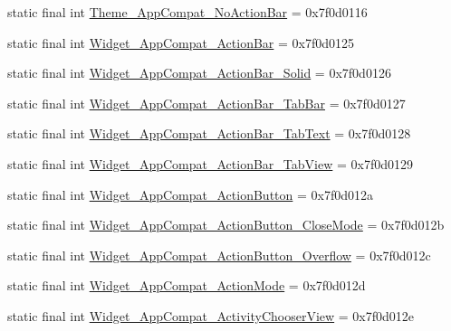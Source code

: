 \begin{DoxyCompactItemize}
\item 
static final int \mbox{\hyperlink{classcom_1_1synnapps_1_1carouselview_1_1_r_1_1style_a14a61ee7904eff959b046b3f48b99ffd}{Theme\+\_\+\+App\+Compat\+\_\+\+No\+Action\+Bar}} = 0x7f0d0116
\item 
static final int \mbox{\hyperlink{classcom_1_1synnapps_1_1carouselview_1_1_r_1_1style_a4849cac4a08a3f020c38133f14896450}{Widget\+\_\+\+App\+Compat\+\_\+\+Action\+Bar}} = 0x7f0d0125
\item 
static final int \mbox{\hyperlink{classcom_1_1synnapps_1_1carouselview_1_1_r_1_1style_ac367b22467bcd90a3dbdb0ae97b1c087}{Widget\+\_\+\+App\+Compat\+\_\+\+Action\+Bar\+\_\+\+Solid}} = 0x7f0d0126
\item 
static final int \mbox{\hyperlink{classcom_1_1synnapps_1_1carouselview_1_1_r_1_1style_acc3eabdcf0507b7cd7670ec8e5adf701}{Widget\+\_\+\+App\+Compat\+\_\+\+Action\+Bar\+\_\+\+Tab\+Bar}} = 0x7f0d0127
\item 
static final int \mbox{\hyperlink{classcom_1_1synnapps_1_1carouselview_1_1_r_1_1style_a81a1505c5c19496998586fb9bf7b60d2}{Widget\+\_\+\+App\+Compat\+\_\+\+Action\+Bar\+\_\+\+Tab\+Text}} = 0x7f0d0128
\item 
static final int \mbox{\hyperlink{classcom_1_1synnapps_1_1carouselview_1_1_r_1_1style_a5ec3bbd43b3cdb7e46fb27cd743510fc}{Widget\+\_\+\+App\+Compat\+\_\+\+Action\+Bar\+\_\+\+Tab\+View}} = 0x7f0d0129
\item 
static final int \mbox{\hyperlink{classcom_1_1synnapps_1_1carouselview_1_1_r_1_1style_ac759d05eb30e0cbb5eabcf60a3d20aaa}{Widget\+\_\+\+App\+Compat\+\_\+\+Action\+Button}} = 0x7f0d012a
\item 
static final int \mbox{\hyperlink{classcom_1_1synnapps_1_1carouselview_1_1_r_1_1style_a653cb058964441a34ed536eb3b6ea4fc}{Widget\+\_\+\+App\+Compat\+\_\+\+Action\+Button\+\_\+\+Close\+Mode}} = 0x7f0d012b
\item 
static final int \mbox{\hyperlink{classcom_1_1synnapps_1_1carouselview_1_1_r_1_1style_a6bc1345d3d7b10086d0040ecb558a129}{Widget\+\_\+\+App\+Compat\+\_\+\+Action\+Button\+\_\+\+Overflow}} = 0x7f0d012c
\item 
static final int \mbox{\hyperlink{classcom_1_1synnapps_1_1carouselview_1_1_r_1_1style_ae89bb602e049e85d8db56c449621b923}{Widget\+\_\+\+App\+Compat\+\_\+\+Action\+Mode}} = 0x7f0d012d
\item 
static final int \mbox{\hyperlink{classcom_1_1synnapps_1_1carouselview_1_1_r_1_1style_a76a8376fe56cd234d5ab1a146a6dab17}{Widget\+\_\+\+App\+Compat\+\_\+\+Activity\+Chooser\+View}} = 0x7f0d012e

\end{DoxyCompactItemize}
